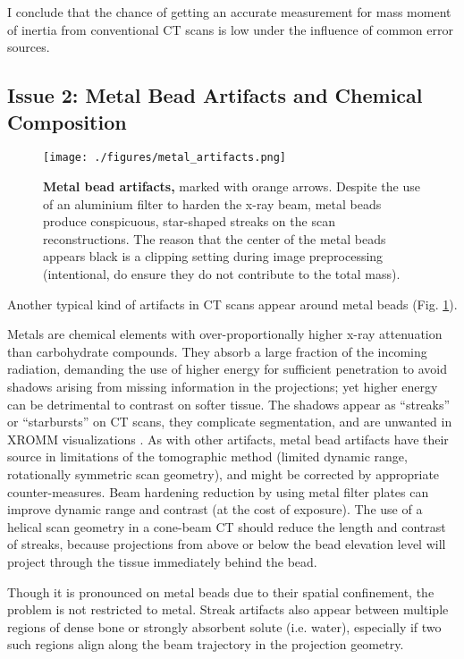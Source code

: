 I conclude that the chance of getting an accurate measurement for mass moment of inertia from conventional CT scans is low under the influence of common error sources.
\subsection{Issue 2: Metal Bead Artifacts and Chemical Composition}
\label{sec:org64089e4}

\begin{figure}[p]
\centering
\texttt{[image: ./figures/metal\_artifacts.png]}
\caption{\label{fig:metal_artifacts}\textbf{Metal bead artifacts,} marked with orange arrows. Despite the use of an aluminium filter to harden the x-ray beam, metal beads produce conspicuous, star-shaped streaks on the scan reconstructions. The reason that the center of the metal beads appears black is a clipping setting during image preprocessing (intentional, do ensure they do not contribute to the total mass).}
\end{figure}

Another typical kind of artifacts in CT scans appear around metal beads (Fig. \ref{fig:metal_artifacts}).

Metals are chemical elements with over-proportionally higher x-ray attenuation than carbohydrate compounds.
They absorb a large fraction of the incoming radiation, demanding the use of higher energy for sufficient penetration to avoid shadows arising from missing information in the projections; yet higher energy can be detrimental to contrast on softer tissue.
The shadows appear as ``streaks'' or ``starbursts'' on CT scans, they complicate segmentation, and are unwanted in XROMM visualizations \citep{Brainerd2010}.
As with other artifacts, metal bead artifacts have their source in limitations of the tomographic method (limited dynamic range, rotationally symmetric scan geometry), and might be corrected by appropriate counter-measures.
Beam hardening reduction by using metal filter plates can improve dynamic range and contrast (at the cost of exposure).
The use of a helical scan geometry in a cone-beam CT should reduce the length and contrast of streaks, because projections from above or below the bead elevation level will project through the tissue immediately behind the bead.

Though it is pronounced on metal beads due to their spatial confinement, the problem is not restricted to metal.
Streak artifacts also appear between multiple regions of dense bone or strongly absorbent solute (i.e. water), especially if two such regions align along the beam trajectory in the projection geometry.


